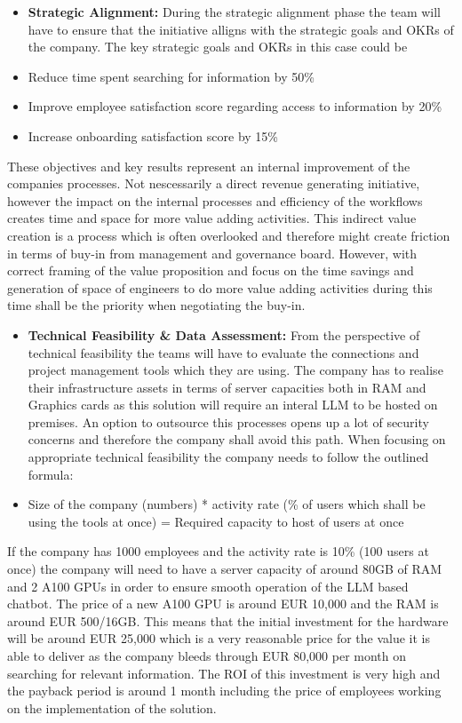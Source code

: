 \documentclass[]{imc-inf}
\def\tightlist{}
\begin{document}
\begin{itemize}
	\tightlist
	\item
	\textbf{Strategic Alignment:} During the strategic alignment phase the
	team will have to ensure that the initiative alligns with the
	strategic goals and OKRs of the company. The key strategic goals and
	OKRs in this case could be
	\item
	Reduce time spent searching for information by 50\%
	\item
	Improve employee satisfaction score regarding access to information by
	20\%
	\item
	Increase onboarding satisfaction score by 15\%
\end{itemize}

These objectives and key results represent an internal improvement of the companies processes. Not nescessarily a direct revenue generating initiative, however the impact on the internal processes and efficiency of the workflows creates time and space for more value adding activities. This indirect value creation is a process which is often overlooked and therefore might create friction in terms of buy-in from management and governance board. However, with correct framing of the value proposition and focus on the time savings and generation of space of engineers to do more value adding activities during this time shall be the priority when negotiating the buy-in.

\begin{itemize}
	\item
	\textbf{Technical Feasibility \& Data Assessment:} From the
	perspective of technical feasibility the teams will have to evaluate
	the connections and project management tools which they are using. The
	company has to realise their infrastructure assets in terms of server
	capacities both in RAM and Graphics cards as this solution will
	require an interal LLM to be hosted on premises. An option to
	outsource this processes opens up a lot of security concerns and
	therefore the company shall avoid this path. When focusing on
	appropriate technical feasibility the company needs to follow the
	outlined formula:
	\item
	Size of the company (numbers) * activity rate (\% of users which shall
	be using the tools at once) = Required capacity to host of users at
	once
\end{itemize}

If the company has 1000 employees and the activity rate is 10\% (100 users at once) the company will need to have a server capacity of around 80GB of RAM and 2 A100 GPUs in order to ensure smooth operation of the LLM based chatbot. The price of a new A100 GPU is around EUR 10,000 and the RAM is around EUR 500/16GB. This means that the initial investment for the hardware will be around EUR 25,000 which is a very reasonable price for the value it is able to deliver as the company bleeds through EUR 80,000 per month on searching for relevant information. The ROI of this investment is very high and the payback period is around 1 month including the price of employees working on the implementation of the solution.
\end{document}
